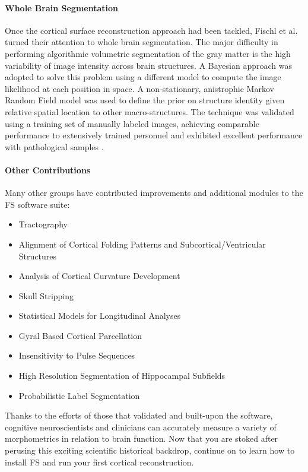 \documentclass[paper=a4, fontsize=11pt]{scrartcl} %
\numberwithin{equation}{section} %
\numberwithin{figure}{section} %
\numberwithin{table}{section} %
\begin{document}
\paragraph{Whole Brain Segmentation} Once the cortical surface reconstruction approach had been tackled, Fischl et al. turned their attention to whole brain segmentation.  The major difficulty in performing algorithmic volumetric segmentation of the gray matter is the high variability of image intensity across brain structures. A Bayesian approach was adopted to solve this problem using a  different model to compute the image likelihood at each position in space. A non-stationary, anistrophic Markov Random Field model was used to define the prior on structure identity given relative spatial location to other macro-structures. The technique was validated using a training set of manually labeled images, achieving comparable performance to extensively trained personnel and exhibited excellent performance with pathological samples \cite{fischl_whole_2002, fischl_sequence-independent_2004}.

\paragraph{Other Contributions}
Many other groups have contributed improvements and additional modules to the FS software suite: 
 \begin{itemize}
\item Tractography \cite{yendiki_automated_2011}
\item Alignment of Cortical Folding Patterns and Subcortical/Ventricular Structures
\cite{postelnicu_combined_2009}
\item Analysis of Cortical Curvature Development \cite{pienaar_methodology_2008}
\item Skull Stripping \cite{segonne_hybrid_2004}
\item Statistical Models for Longitudinal Analyses \cite{reuter_within-subject_2012}
\item Gyral Based Cortical Parcellation \cite{desikan_automated_2006}
\item Insensitivity to Pulse Sequences \cite{han_reliability_2006}
\item High Resolution Segmentation of Hippocampal Subfields \cite{van_leemput_automated_2009}
\item Probabilistic Label Segmentation \cite{sabuncu_generative_2010}
\end{itemize}


Thanks to the efforts of those that validated and built-upon the software, cognitive neuroscientists and clinicians can accurately measure a variety of morphometrics in relation to brain function. Now that you are stoked after perusing this exciting scientific historical backdrop, continue on to learn how to install FS and run your first cortical reconstruction.
\end{document}
